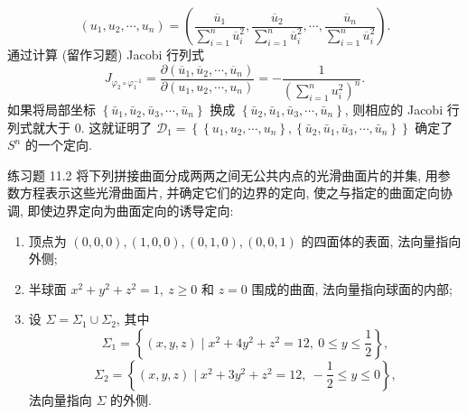 \begin{solution}[证法 2]
\[\]
\[
  \left(u_{1}, u_{2}, \cdots, u_{n}\right)=\left(\frac{\overline{u}_{1}}{\sum_{i=1}^{n} \overline{u}_{i}^{2}}, \frac{\overline{u}_{2}}{\sum_{i=1}^{n} \overline{u}_{i}^{2}}, \cdots, \frac{\overline{u}_{n}}{\sum_{i=1}^{n} \overline{u}_{i}^{2}}\right).
\]
通过计算 (留作习题) Jacobi 行列式
\[
  J_{\varphi_{2} \circ \varphi_{1}^{-1}}=\frac{\partial\left(\overline{u}_{1}, \overline{u}_{2}, \cdots, \overline{u}_{n}\right)}{\partial\left(u_{1}, u_{2}, \cdots, u_{n}\right)}=-\frac{1}{\left(\sum_{i=1}^{n} u_{i}^{2}\right)^{n}}.
\]
如果将局部坐标 $\left\{\bar{u}_{1}, \bar{u}_{2}, \bar{u}_{3}, \cdots, \bar{u}_{n}\right\}$ 换成 $\left\{\bar{u}_{2}, \bar{u}_{1}, \bar{u}_{3}, \cdots, \bar{u}_{n}\right\}$, 则相应的 Jacobi 行列式就大于 0. 这就证明了 $\mathcal{D}_{1}=\left\{\left\{u_{1}, u_{2}, \cdots, u_{n}\right\},\left\{\bar{u}_{2}, \bar{u}_{1}, \bar{u}_{3}, \cdots, \bar{u}_{n}\right\}\right\}$ 确定了 $S^{n}$ 的一个定向. \qedhere
\end{solution}

\begin{exblock}{练习题 11.2}
将下列拼接曲面分成两两之间无公共内点的光滑曲面片的并集, 用参数方程表示这些光滑曲面片, 并确定它们的边界的定向, 使之与指定的曲面定向协调, 即使边界定向为曲面定向的诱导定向:
\begin{enumerate}[label=(\arabic*),leftmargin=2.6em,itemsep=0.15\baselineskip,topsep=0.2\baselineskip]
  \item 顶点为 $(0,0,0),(1,0,0),(0,1,0),(0,0,1)$ 的四面体的表面, 法向量指向外侧;
  \item 半球面 $x^{2}+y^{2}+z^{2}=1,\ z \geqslant 0$ 和 $z=0$ 围成的曲面, 法向量指向球面的内部;
  \item 设 $\Sigma=\Sigma_{1} \cup \Sigma_{2}$, 其中
    \[
      \Sigma_{1}=\left\{(x, y, z) \mid x^{2}+4 y^{2}+z^{2}=12,\ 0 \leqslant y \leqslant \frac{1}{2}\right\},
    \]
    \[
      \Sigma_{2}=\left\{(x, y, z) \mid x^{2}+3 y^{2}+z^{2}=12,\ -\frac{1}{2} \leqslant y \leqslant 0\right\},
    \]
    法向量指向 $\Sigma$ 的外侧.
\end{enumerate}
\end{exblock}

